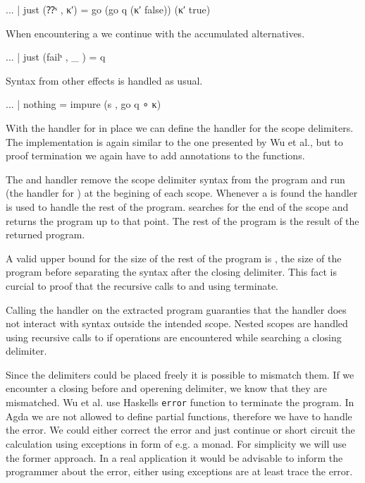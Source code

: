 \begin{AgdaAlign}
\begin{code}
    ... | just (⁇ˢ     , κ′)  = go (go q (κ′ false)) (κ′ true)
\end{code}
When encountering a  we continue with the accumulated
alternatives.

\begin{code}
    ... | just (failˢ  , _ )  = q
\end{code}
Syntax from other effects is handled as usual.

\begin{code}
    ... | nothing             = impure (s , go q ∘ κ)
\end{code}
\end{AgdaAlign}
With the handler for  in place we can define the handler for the
scope delimiters.
The implementation is again similar to the one presented by Wu et al., but to
proof termination we again have to add  annotations to the
functions.

The  and  handler remove the scope
delimiter syntax from the program and run  (the handler
for ) at the begining of each scope.
Whenever a  is found the handler  is
used to handle the rest of the program.
 searches for the end of the scope and returns the program
up to that point.
The rest of the program is the result of the returned program.

A valid upper bound for the size of the rest of the program is ,
the size of the program before separating the syntax after the closing delimiter.
This fact is curcial to proof that the recursive calls to  and
 using \AgdaFunction{>>=} terminate.

Calling the handler on the extracted program guaranties that the handler does
not interact with syntax outside the intended scope.
Nested scopes are handled using recursive calls to  if
 operations are encountered while searching a closing
delimiter.

Since the delimiters could be placed freely it is possible to mismatch them.
If we encounter a closing before and operening delimiter, we know that they are
mismatched.
Wu et al. use Haskells \texttt{error} function to terminate the program.
In Agda we are not allowed to define partial functions, therefore we have to
handle the error.
We could either correct the error and just continue or short circuit the
calculation using exceptions in form of e.g. a  monad.
For simplicity we will use the former approach.
In a real application it would be advisable to inform the programmer about the
error, either using exceptions are at least trace the error.

